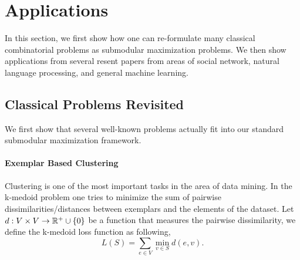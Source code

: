 \section{Applications}
\label{sec:applications}
In this section, we first show how one can re-formulate many classical combinatorial problems as submodular maximization problems. We then show applications  from several resent papers from areas of social network, natural language processing, and general machine learning. 







\subsection{Classical Problems Revisited}
\label{sec:classical}
We first show that several well-known problems actually fit into our standard submodular maximization framework.

\paragraph{Exemplar Based Clustering}
Clustering is one of the most important tasks in the area of data mining. In the k-medoid problem \cite{KR09} one tries to minimize the sum of pairwise dissimilarities/distances between exemplars and the elements of the dataset. Let $d: V \times V \rightarrow \mathbb{R}^+\cup\{0\}$ be a function that measures the pairwise dissimilarity, we define the k-medoid loss function as following,
$$L(S) = \sum_{e\in V} \min_{v\in S} d(e, v).$$

